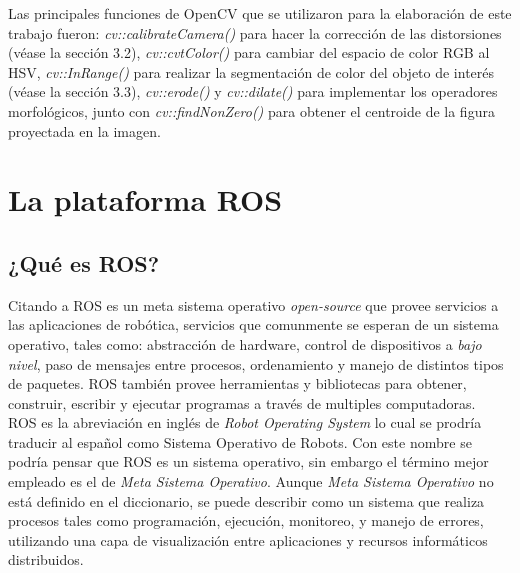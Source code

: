 	Las principales funciones de OpenCV que se utilizaron para la elaboración de este trabajo fueron:  \textit{cv::calibrateCamera()} para hacer la corrección de las distorsiones (véase la sección 3.2), \textit{cv::cvtColor()} para cambiar del espacio de color RGB al HSV, \textit{cv::InRange()} para realizar la segmentación de color del objeto de interés (véase la sección 3.3), \textit{cv::erode()} y \textit{cv::dilate()} para implementar los operadores morfológicos, junto con \textit{cv::findNonZero()} para obtener el centroide de la figura proyectada en la imagen. 
	
	\section{La plataforma ROS}
		\subsection*{¿Qué es ROS?}
Citando a \cite{pyo2015ros} ROS es un meta sistema operativo \textit{open-source} que provee servicios a las aplicaciones de robótica, servicios que comunmente se esperan de un sistema operativo, tales como: abstracción de hardware, control de dispositivos a \textit{bajo nivel}, paso de mensajes entre procesos, ordenamiento y manejo de distintos tipos de paquetes. ROS también provee herramientas y bibliotecas para obtener, construir, escribir y ejecutar programas a través de multiples computadoras.\\

ROS es la abreviación en inglés de \textit{Robot Operating System} lo cual se prodría traducir al español como Sistema Operativo de Robots. Con este nombre se podría pensar que ROS es un sistema operativo, sin embargo el término mejor empleado es el de \textit{Meta Sistema Operativo}. Aunque \textit{Meta Sistema Operativo} no está definido en el diccionario, se puede describir como un sistema que realiza procesos tales como programación, ejecución, monitoreo, y manejo de errores, utilizando una capa de visualización entre aplicaciones y recursos informáticos distribuidos.\\

